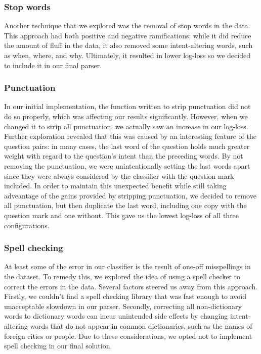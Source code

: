 \documentclass{article}
\begin{document}
\subsubsection{Stop words}

Another technique that we explored was the removal of stop words in the data.
This approach had both positive and negative ramifications: while it did reduce
the amount of fluff in the data, it also removed some intent-altering words,
such as when, where, and why. Ultimately, it resulted in lower log-loss so we
decided to include it in our final parser.

\subsubsection{Punctuation}

In our initial implementation, the function written to strip punctuation did not do
so properly, which was affecting our results significantly. However, when we
changed it to strip all punctuation, we actually saw an increase in our
log-loss. Further exploration revealed that this was caused by an interesting
feature of the question pairs: in many cases, the last word of the question holds
much greater weight with regard to the question's intent than the preceding
words. By not removing the punctuation, we were unintentionally setting the last
words apart since they were always considered by the classifier with the
question mark included. In order to maintain this unexpected benefit while still
taking adveantage of the gains provided by stripping punctuation, we decided to
remove all punctuation, but then duplicate the last word, including one copy
with the question mark and one without. This gave us the lowest log-loss of all
three configurations.

\subsubsection{Spell checking}

At least some of the error in our classifier is the result of one-off misspellings
in the dataset. To remedy this, we explored the idea of using a spell checker to
correct the errors in the data. Several factors steered us away from this
approach. Firstly, we couldn't find a spell checking library that was fast
enough to avoid unacceptable slowdown in our parser. Secondly, correcting all
non-dictionary words to dictionary words can incur unintended side effects by
changing intent-altering words that do not appear in common dictionaries, such
as the names of foreign cities or people. Due to these considerations, we opted not to
implement spell checking in our final solution.
\end{document}
